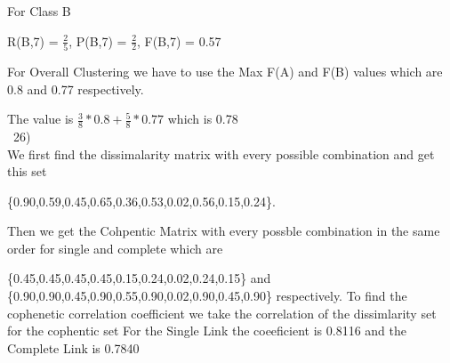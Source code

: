 \documentclass[12pt,english]{article}
\begin{document}
For Class B\par                            
R(B,7) = $\frac{2}{5}$, P(B,7) = $\frac{2}{2}$, F(B,7) = 0.57\par
For Overall Clustering we have to use the Max F(A) and F(B) values which are 0.8 and 0.77 respectively.\par
The value is $\frac{3}{8} * 0.8 +\frac{5}{8} * 0.77$ which is 0.78\\\
26)\\
We first find the dissimalarity matrix with every possible combination and get this set\par
 \{0.90,0.59,0.45,0.65,0.36,0.53,0.02,0.56,0.15,0.24\}.\par
Then we get the Cohpentic Matrix with every possble combination in the same order for single and complete which are \par
\{0.45,0.45,0.45,0.45,0.15,0.24,0.02,0.24,0.15\} and \{0.90,0.90,0.45,0.90,0.55,0.90,0.02,0.90,0.45,0.90\} respectively.
To find the cophenetic correlation coefficient we take the correlation of the dissimlarity set for the cophentic set
For the Single Link the coeeficient is 0.8116 and the Complete Link is 0.7840
\end{document}
